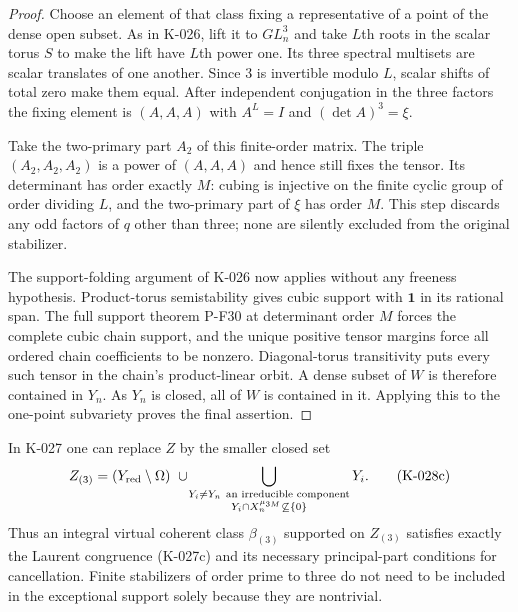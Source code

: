 \begin{proof}
Choose an element of that class fixing a representative of a
point of the dense open subset.  As in K-026, lift it to $GL_n^3$
and take $L$th roots in the scalar torus $S$ to make the lift
have $L$th power one.  Its three spectral multisets are scalar
translates of one another.  Since $3$ is invertible modulo $L$,
scalar shifts of total zero make them equal.  After independent
conjugation in the three factors the fixing element is
$(A,A,A)$ with $A^L=I$ and $(\det A)^3=\xi$.

Take the two-primary part $A_2$ of this finite-order matrix.
The triple $(A_2,A_2,A_2)$ is a power of $(A,A,A)$ and hence
still fixes the tensor.  Its determinant has order exactly $M$:
cubing is injective on the finite cyclic group of order dividing
$L$, and the two-primary part of $\xi$ has order $M$.
This step discards any odd factors of $q$ other than three;
none are silently excluded from the original stabilizer.

The support-folding argument of K-026 now applies without any
freeness hypothesis.  Product-torus semistability gives cubic
support with $\mathbf1$ in its rational span.  The full support
theorem P-F30 at determinant order $M$ forces the complete cubic
chain support, and the unique positive tensor margins force
all ordered chain coefficients to be nonzero.  Diagonal-torus
transitivity puts every such tensor in the chain's product-linear
orbit.  A dense subset of $W$ is therefore contained in $Y_n$.
As $Y_n$ is closed, all of $W$ is contained in it.  Applying this
to the one-point subvariety proves the final assertion.
\end{proof}

\begin{corollary}
In K-027 one can replace $Z$ by the smaller closed set
\[
 Z_{(3)}=(Y_{\rm red}\setminus\Omega)
       \ \cup\!
       \bigcup_{\substack{Y_i\ne Y_n\ \text{an irreducible component}\\
                    Y_i\cap X_n^{\mu_{3M}}\not\subseteq\{0\}}}Y_i.
                                                        \tag{K-028c}
\]
Thus an integral virtual coherent class $\beta_{(3)}$ supported
on $Z_{(3)}$ satisfies exactly the Laurent congruence (K-027c)
and its necessary principal-part conditions for cancellation.
Finite stabilizers of order prime to three do not need to be
included in the exceptional support solely because they are
nontrivial.
\end{corollary}

